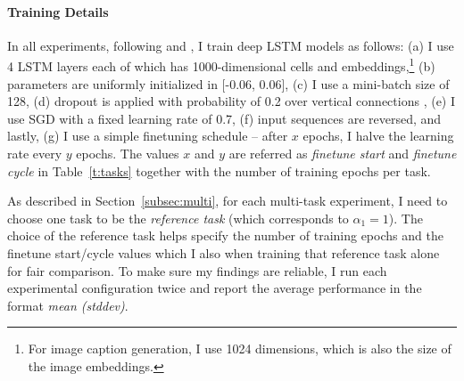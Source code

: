 \paragraph{Training Details}

In all experiments, following \citet{sutskever14} and \citet{luong15}, I train deep LSTM
models as follows: (a) I use 4 LSTM layers each of which has
1000-dimensional cells and embeddings,\footnote{For image caption generation, I use 1024
dimensions, which is also the size of the image embeddings.} (b) parameters are
uniformly initialized in [-0.06, 0.06], (c) I use a mini-batch size of 128, (d)
dropout is applied with probability of 0.2 over vertical connections
\citep{pham2014dropout}, (e) I use SGD with a fixed
learning rate of 0.7, (f) input sequences are reversed, and lastly, (g) I use a simple finetuning schedule -- after $x$
epochs, I halve the learning rate every $y$ epochs. The values $x$ and $y$
are referred as {\it finetune start} and {\it finetune cycle} in
Table~\ref{t:tasks} together with the number of training epochs per task.

As described in Section~\ref{subsec:multi}, for each multi-task
experiment, I need to choose one task to be the {\it reference
task} (which corresponds to $\alpha_1 = 1$). The choice of the
reference task helps specify the number of training epochs and the
finetune start/cycle values which I also when training that reference
task alone for fair comparison. To make sure my findings are
reliable, I run each experimental configuration twice and
report the average performance in the format {\it mean (stddev)}.

